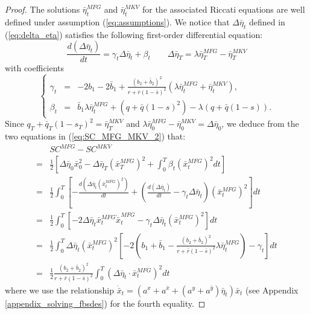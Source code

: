 \documentclass[11pt]{article}
\begin{document}
\begin{proof}
	The solutions $\bar{\eta}^{MFG}_t$ and $\bar{\eta}^{MKV}_t$ for the associated Riccati equations are well defined under assumption (\ref{eq:assumptions}). We notice that $\Delta\bar{\eta}_t$ defined in (\ref{eq:delta_eta}) satisfies the following first-order differential equation:
	\begin{equation*}
		\frac{d( \Delta{\bar{\eta}}_t)}{dt} = \gamma_t \Delta\bar{\eta}_t + \beta_t
		\qquad \Delta{\bar{\eta}}_T = \lambda \bar{\eta}_T^{MFG} - \bar{\eta}_T^{MKV}
	\end{equation*}
	with coefficients 
	\begin{equation*}
	\left\{
		\begin{array}{rcl}
			\gamma_t &=& \displaystyle -2 b_1 - 2\bar{b}_1 + \frac{(b_2 + \bar{b}_2)^2}{r + \bar{r}(1-\bar{s})^2} \left(\lambda \bar{\eta}_t^{MFG} + \bar{\eta}_t^{MKV} \right),\\
			\beta_t &=& \bar{b}_1 \lambda \bar{\eta}_t^{MFG} + (q + \bar{q}(1-s)^2) - \lambda (q + \bar{q}(1-s)).
		\end{array}
	\right.
	\end{equation*} 
	Since $q_T + \bar{q}_T(1-s_T)^2 = \bar{\eta}_T^{MKV}$ and $\lambda \bar{\eta}_0^{MFG} - \bar{\eta}_0^{MKV} = \Delta\bar{\eta}_0$, we deduce from the two equations in (\ref{eq:SC_MFG_MKV_2}) that:
	\begin{equation*}
		\begin{split}
			& SC^{MFG} - SC^{MKV}\\
			=& \frac{1}{2} \left[ \Delta\bar{\eta}_0 \bar{x}_0^2 - \Delta\bar{\eta}_T (\bar{x}_T^{MFG})^2 + \int_0^T \beta_t (\bar{x}_t^{MFG})^2 dt \right] \\
			=& \frac{1}{2} \int_0^T \left[ - \frac{d (\Delta\bar{\eta}_t (\bar{x}_t^{MFG})^2) }{dt}  + \left( 	\frac{d( \Delta{\bar{\eta}}_t)}{dt} - \gamma_t \Delta\bar{\eta}_t  \right)(\bar{x}_t^{MFG})^2 \right] dt\\
			=& \frac{1}{2}\int_0^T \left[- 2\Delta{\bar{\eta}}_t \bar{x}_t^{MFG} \dot{\bar{x}}_t^{MFG} - \gamma_t \Delta{\bar{\eta}}_t (\bar{x}_t^{MFG})^2 \right]dt \\
			=& \frac{1}{2} \int_0^T \Delta{\bar{\eta}}_t (\bar{x}_t^{MFG})^2 \left[-2(b_1 + \bar{b}_1 - \frac{(b_2+\bar{b}_2)^2}{r + \bar{r}(1-\bar{s})^2} \lambda \bar{\eta}_t^{MFG}) - \gamma_t\right] dt\\
			=& \frac{1}{2} \frac{(b_2 + \bar{b}_2)^2}{r + \bar{r}(1-\bar{s})^2} \int_0^T (\Delta \bar{\eta}_t \cdot \bar{x}_t^{MFG})^2 dt
		\end{split}
	\end{equation*}
	where we use the relationship $\dot{\bar{x}}_t = (a^x+a^{\bar{x}}+(a^y+a^{\bar{y}})\bar{\eta}_t)\bar{x}_t$ (see Appendix \ref{appendix_solving_fbsdes}) for the fourth equality.	
	
\end{proof}
\end{document}
